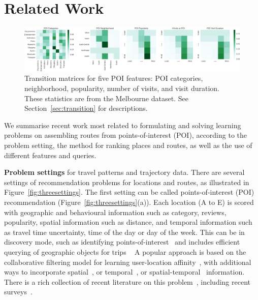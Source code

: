 
\section{Related Work}
\label{sec:relatedwork}


\begin{figure}[htbp]
\includegraphics[width=\textwidth]{fig/poi_transmat.png}
\caption{Transition matrices for five POI features: POI categories, neighborhood, popularity, number of visits, and visit duration. These statistics are from the Melbourne dataset. See Section~\ref{sec:transition} for descriptions.}
\label{fig:transmat}
\end{figure}



We summarise recent work most related to formulating and solving learning problems on assembling routes
from points-of-interest (POI), according to the problem setting, the method for ranking places and routes, as well as the use of different features and queries.

{\bf Problem settings} for travel patterns and trajectory data.
There are several settings of recommendation problems for locations and routes, as illustrated in Figure~\ref{fig:threesettings}.
The first setting can be called points-of-interest (POI) recommendation (Figure~\ref{fig:threesettings}(a)). Each location (A to E) is scored with geographic and behavioural information such as category, reviews, popularity, spatial information such as distance, and temporal information such as travel time uncertainty, time of the day or day of the week.
This can be in discovery mode, such as identifying points-of-interest~\cite{zheng2009mining,li2015instagram} and includes efficient querying of geographic objects for trips ~\cite{hashem2015efficient}
A popular approach is based on the collaborative filtering model
for learning user-location affinity~\cite{shi2011personalized}, with additional ways to incorporate spatial~\cite{lian2014geomf,liu2014exploiting}, or temporal~\cite{yuan2013timeaware,hsieh2014mining,gao2013temporal}, or spatial-temporal~\cite{yuan2014graph} information.
There is a rich collection of recent literature on this problem~\cite{yin2015joint,shi2011personalized,lian2014geomf,liu2014exploiting,yuan2013timeaware,hsieh2014mining,gao2013temporal,yuan2014graph}, including recent surveys~\cite{bao2015recommendations,zheng2014urban}.


